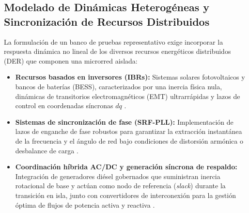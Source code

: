 \subsection{Modelado de Dinámicas Heterogéneas y Sincronización de Recursos Distribuidos}
La formulación de un banco de pruebas representativo exige incorporar la respuesta dinámica no lineal de los diversos recursos energéticos distribuidos (DER) que componen una microrred aislada:
\begin{itemize}
    \item \textbf{Recursos basados en inversores (IBRs):} Sistemas solares fotovoltaicos y bancos de baterías (BESS), caracterizados por una inercia física nula, dinámicas de transitorios electromagnéticos (EMT) ultrarrápidas y lazos de control en coordenadas síncronas $dq$ \citep{Mehrzad2025, Liu2025Multirate}.
    \item \textbf{Sistemas de sincronización de fase (SRF-PLL):} Implementación de lazos de enganche de fase robustos para garantizar la extracción instantánea de la frecuencia y el ángulo de red bajo condiciones de distorsión armónica o desbalance de carga \citep{Kundu2024ICCFPLL}.
    \item \textbf{Coordinación híbrida AC/DC y generación síncrona de respaldo:} Integración de generadores diésel gobernados que suministran inercia rotacional de base y actúan como nodo de referencia (\textit{slack}) durante la transición en isla, junto con convertidores de interconexión para la gestión óptima de flujos de potencia activa y reactiva \citep{Alam2024, MartinezGomez2025Distributed, Pompodakis2022Sensitivity, DiFazio2024Linear}.
\end{itemize}


